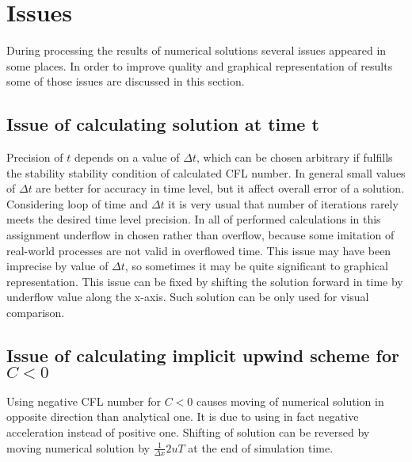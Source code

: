 \section{Issues}
	During processing the results of numerical solutions several issues appeared in some places. In order to improve quality and graphical representation of results some of those issues are discussed in this section.
	
	\subsection{Issue of calculating solution at time t}
		Precision of $t$ depends on a value of $\Delta t$, which can be chosen arbitrary if fulfills the stability stability condition of calculated CFL number. In general small values of $\Delta t$ are better for accuracy in time level, but it affect overall error of a solution. Considering loop of time and $\Delta t$ it is very usual that number of iterations rarely meets the desired time level precision. In all of performed calculations in this assignment underflow in chosen rather than overflow, because some imitation of real-world processes are not valid in overflowed time. This issue may have been imprecise by value of $\Delta t$, so sometimes it may be quite significant to graphical representation. This issue can be fixed by shifting the solution forward in time by underflow value along the x-axis. Such solution can be only used for visual comparison.
		
	\subsection{Issue of calculating implicit upwind scheme for $C<0$}
		Using negative CFL number for $C<0$ causes moving of numerical solution in opposite direction than analytical one. It is due to using in fact negative acceleration instead of positive one. Shifting of solution can be reversed by moving numerical solution by $\frac{1}{\Delta x}2uT $ at the end of simulation time.  
\clearpage